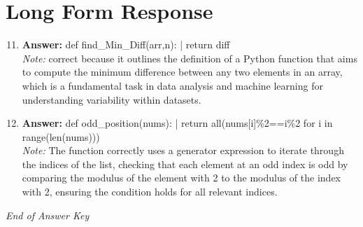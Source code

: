 \documentclass[12pt]{article}
\begin{document}
\section*{Long Form Response}
\begin{enumerate}[label=\arabic*.]
\setcounter{enumi}{10}
\item \textbf{Answer:} def find\_Min\_Diff(arr,n): | return diff
\\ \textit{Note:} correct because it outlines the definition of a Python function that aims to compute the minimum difference between any two elements in an array, which is a fundamental task in data analysis and machine learning for understanding variability within datasets.
\item \textbf{Answer:} def odd\_position(nums): | return all(nums[i]\%2==i\%2 for i in range(len(nums)))
\\ \textit{Note:} The function correctly uses a generator expression to iterate through the indices of the list, checking that each element at an odd index is odd by comparing the modulus of the element with 2 to the modulus of the index with 2, ensuring the condition holds for all relevant indices.
\end{enumerate}

\vfill
\noindent\textit{End of Answer Key}
\end{document}
